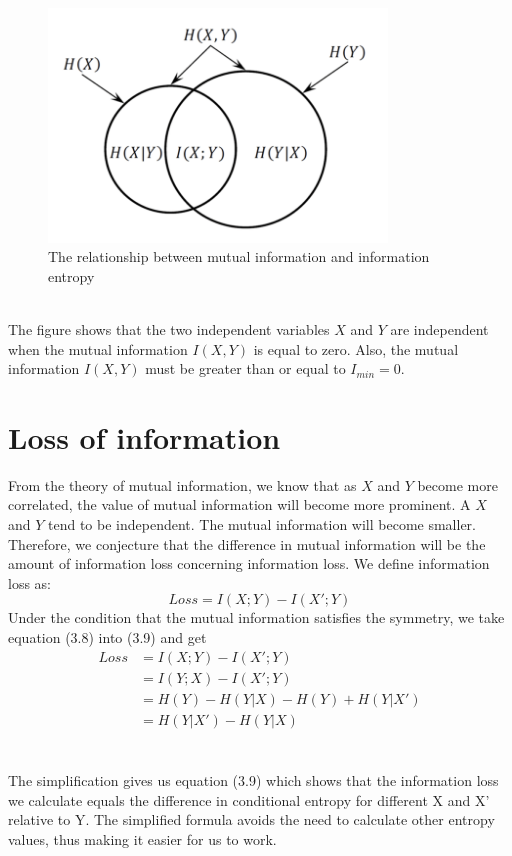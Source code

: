 \begin{figure}[htbp]
    \centering
    \includegraphics[width=9cm]{report/pics/MI.png}
    \caption{The relationship between mutual information and information entropy}
    \label{fig:my_label}
\end{figure}\\
The figure shows that the two independent variables $X$ and $Y$ are independent when the mutual information $I (X, Y)$ is equal to zero. Also, the mutual information $I (X, Y)$ must be greater than or equal to $I_{min} = 0 $.


\section{Loss of information}
From the theory of mutual information, we know that as $X$ and $Y$ become more correlated, the value of mutual information will become more prominent. A $X$ and $Y$ tend to be independent. The mutual information will become smaller. Therefore, we conjecture that the difference in mutual information will be the amount of information loss concerning information loss. We define information loss as:
\begin{equation}
Loss = I(X;Y) - I(X';Y)
\end{equation}
Under the condition that the mutual information satisfies the symmetry, we take equation (3.8) into (3.9) and get
\begin{equation}
\begin{split}
Loss &= I(X;Y) - I(X';Y)\\
&= I(Y;X) - I(X';Y)\\
&=H(Y) - H(Y|X) - H(Y) + H(Y|X')\\
&=H(Y|X') - H(Y|X)
\end{split}
\end{equation}
\\ \hspace*{\fill} \\
The simplification gives us equation (3.9) which shows that the information loss we calculate equals the difference in conditional entropy for different X and X' relative to Y. The simplified formula avoids the need to calculate other entropy values, thus making it easier for us to work.


